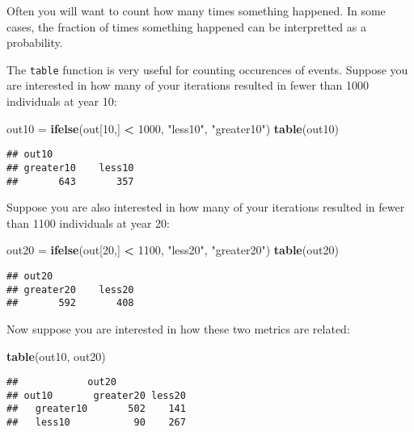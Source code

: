 \documentclass[]{book}
\newenvironment{Shaded}{\begin{snugshade}}{\end{snugshade}}
\newcommand{\KeywordTok}[1]{\textcolor[rgb]{0.13,0.29,0.53}{\textbf{#1}}}
\newcommand{\DecValTok}[1]{\textcolor[rgb]{0.00,0.00,0.81}{#1}}
\newcommand{\StringTok}[1]{\textcolor[rgb]{0.31,0.60,0.02}{#1}}
\newcommand{\OperatorTok}[1]{\textcolor[rgb]{0.81,0.36,0.00}{\textbf{#1}}}
\newcommand{\NormalTok}[1]{#1}
\theoremstyle{definition}
\theoremstyle{definition}
\theoremstyle{definition}
\theoremstyle{remark}
\begin{document}
Often you will want to count how many times something happened. In some
cases, the fraction of times something happened can be interpretted as a
probability.

The \texttt{table} function is very useful for counting occurences of
events. Suppose you are interested in how many of your iterations
resulted in fewer than 1000 individuals at year 10:

\begin{Shaded}
\begin{Highlighting}[]
\NormalTok{out10 =}\StringTok{ }\KeywordTok{ifelse}\NormalTok{(out[}\DecValTok{10}\NormalTok{,] }\OperatorTok{<}\StringTok{ }\DecValTok{1000}\NormalTok{, }\StringTok{"less10"}\NormalTok{, }\StringTok{"greater10"}\NormalTok{)}
\KeywordTok{table}\NormalTok{(out10)}
\end{Highlighting}
\end{Shaded}

\begin{verbatim}
## out10
## greater10    less10 
##       643       357
\end{verbatim}

Suppose you are also interested in how many of your iterations resulted
in fewer than 1100 individuals at year 20:

\begin{Shaded}
\begin{Highlighting}[]
\NormalTok{out20 =}\StringTok{ }\KeywordTok{ifelse}\NormalTok{(out[}\DecValTok{20}\NormalTok{,] }\OperatorTok{<}\StringTok{ }\DecValTok{1100}\NormalTok{, }\StringTok{"less20"}\NormalTok{, }\StringTok{"greater20"}\NormalTok{)}
\KeywordTok{table}\NormalTok{(out20)}
\end{Highlighting}
\end{Shaded}

\begin{verbatim}
## out20
## greater20    less20 
##       592       408
\end{verbatim}

Now suppose you are interested in how these two metrics are related:

\begin{Shaded}
\begin{Highlighting}[]
\KeywordTok{table}\NormalTok{(out10, out20)}
\end{Highlighting}
\end{Shaded}

\begin{verbatim}
##            out20
## out10       greater20 less20
##   greater10       502    141
##   less10           90    267
\end{verbatim}
\end{document}
